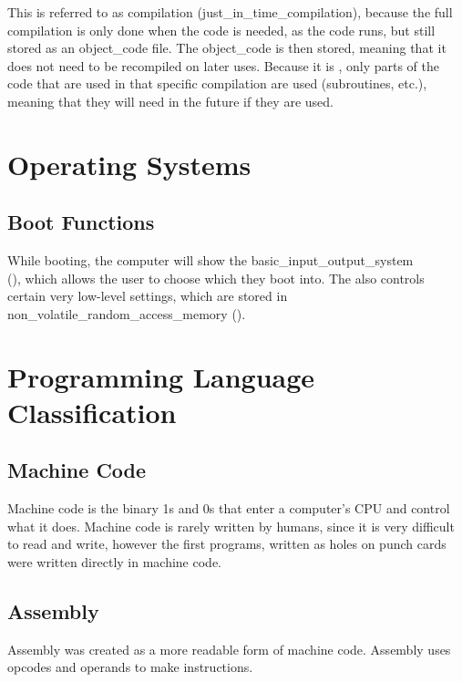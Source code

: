             This is referred to as \acroJIT \gls{compilation} (\gls{just_in_time_compilation}), because the full \gls{compilation} is only done when the \gls{code} is needed, as the \gls{code} runs, but still stored as an \gls{object_code} file.
            The \gls{object_code} is then stored, meaning that it does not need to be recompiled on later uses.
            Because it is \acroJIT, only parts of the \gls{code} that are used in that specific \gls{compilation} are used (\glspl{subroutine}, etc.), meaning that they will need  in the future if they are used.

    \newpage
    
\section{Operating Systems} \label{operating_systems}
    \subsection{Boot Functions}
        While booting, the computer will show the \gls{basic_input_output_system} \\ (\acroBIOS), which allows the user to choose which \acroOS they boot into.
        The \acroBIOS also controls certain very low-level settings, which are stored in \gls{non_volatile_random_access_memory} (\acroNVRAM).

    \newpage

\section{Programming Language Classification} \label{programming_language_classification}
    \subsection{Machine Code}
        Machine code is the binary 1s and 0s that enter a computer's CPU and control what it does.
        Machine code is rarely written by humans, since it is very difficult to read and write, however the first programs, written as holes on punch cards were written directly in machine code.

    \subsection{Assembly}
        Assembly was created as a more readable form of machine code.
        Assembly uses opcodes and operands to make instructions.
        
